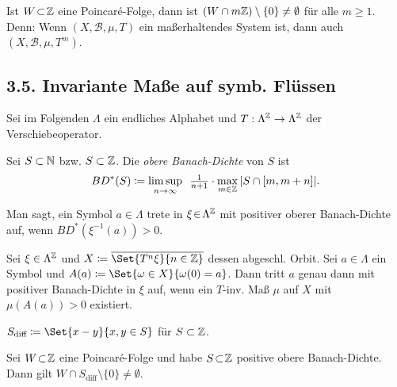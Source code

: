 \documentclass{cheat-sheet}
\newcommand{\clos}[1]{\overline{#1}} %
\newcommand{\Bor}{\mathcal{B}} %
\newcommand{\meST}{$(X, \Bor, \mu, T)$} %
\begin{document}
\begin{bem}
  Ist $W \!\subset\! \mathbb{Z}$ eine Poincaré-Folge, dann ist $(W \cap m \mathbb{Z}) \setminus \{ 0 \} \neq \emptyset$ für alle $m \geq 1$.
  Denn: Wenn \meST{} ein maßerhaltendes System ist, dann auch $(X, \Bor, \mu, T^m)$.
\end{bem}

\begin{samepage}
  \section{3.5. Invariante Maße auf symb. Flüssen}
\end{samepage}

\begin{bem}
  Sei im Folgenden $\Lambda$ ein endliches Alphabet und $T : \Lambda^{\mathbb{Z}} \to \Lambda^{\mathbb{Z}}$ der Verschiebeoperator.
\end{bem}

\begin{defn}
  Sei $S \subset \mathbb{N}$ bzw. $S \subset \mathbb{Z}$. Die \emph{obere Banach-Dichte} von $S$ ist
  \[ BD^*(S) \coloneqq \limsup_{n \to \infty} \enspace \tfrac{1}{n+1} \cdot \max_{m \in \mathbb{Z}} \, \lvert S \cap \left[ m, m+n \right]\rvert. \]
\end{defn}


\begin{defn}
  Man sagt, ein Symbol $a \in \Lambda$ trete in $\xi \!\in\! \Lambda^{\mathbb{Z}}$ mit positiver oberer Banach-Dichte auf, wenn $BD^*(\xi^{-1}(a)) > 0$.
\end{defn}

\begin{lem}
  Sei $\xi \in \Lambda^{\mathbb{Z}}$ und $X \coloneqq \clos{\Set{T^n \xi}{n \in \Z}}$ dessen abgeschl. Orbit.
  Sei $a \in \Lambda$ ein Symbol und $A(a) \coloneqq \Set{\omega \in X}{\omega(0) = a}$.
  Dann tritt $a$ genau dann mit positiver Banach-Dichte in $\xi$ auf, wenn ein $T$-inv. Maß $\mu$ auf $X$ mit $\mu(A(a)) > 0$ existiert.
\end{lem}

\begin{nota}
  $S_{\text{diff}} \coloneqq \Set{x - y}{x, y \in S}$ für $S \subset \mathbb{Z}$.
\end{nota}

\begin{thm}
  Sei $W \!\subset\! \mathbb{Z}$ eine Poincaré-Folge und habe $S \!\subset\! \mathbb{Z}$ positive obere Banach-Dichte.
  Dann gilt
  $W \cap S_{\text{diff}} \setminus \{ 0 \} \neq \emptyset$.
\end{thm}
\end{document}
